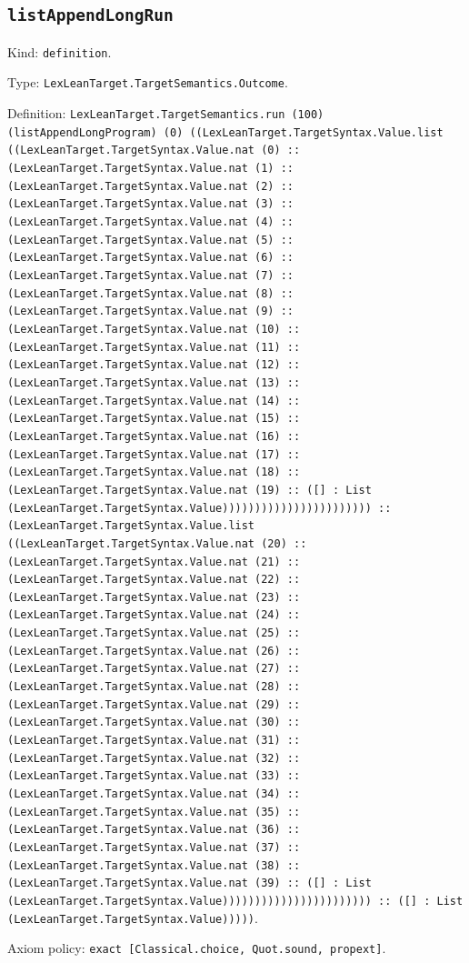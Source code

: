 \documentclass[11pt]{article}
\begin{document}
\subsection*{\texttt{listAppendLongRun}}
\noindent Kind: \texttt{definition}.\par
\noindent Type: \texttt{LexLeanTarget.TargetSemantics.Outcome}.\par
\noindent Definition: \texttt{LexLeanTarget.TargetSemantics.run (100) (listAppendLongProgram) (0) ((LexLeanTarget.TargetSyntax.Value.list ((LexLeanTarget.TargetSyntax.Value.nat (0) :: (LexLeanTarget.TargetSyntax.Value.nat (1) :: (LexLeanTarget.TargetSyntax.Value.nat (2) :: (LexLeanTarget.TargetSyntax.Value.nat (3) :: (LexLeanTarget.TargetSyntax.Value.nat (4) :: (LexLeanTarget.TargetSyntax.Value.nat (5) :: (LexLeanTarget.TargetSyntax.Value.nat (6) :: (LexLeanTarget.TargetSyntax.Value.nat (7) :: (LexLeanTarget.TargetSyntax.Value.nat (8) :: (LexLeanTarget.TargetSyntax.Value.nat (9) :: (LexLeanTarget.TargetSyntax.Value.nat (10) :: (LexLeanTarget.TargetSyntax.Value.nat (11) :: (LexLeanTarget.TargetSyntax.Value.nat (12) :: (LexLeanTarget.TargetSyntax.Value.nat (13) :: (LexLeanTarget.TargetSyntax.Value.nat (14) :: (LexLeanTarget.TargetSyntax.Value.nat (15) :: (LexLeanTarget.TargetSyntax.Value.nat (16) :: (LexLeanTarget.TargetSyntax.Value.nat (17) :: (LexLeanTarget.TargetSyntax.Value.nat (18) :: (LexLeanTarget.TargetSyntax.Value.nat (19) :: ([] : List (LexLeanTarget.TargetSyntax.Value))))))))))))))))))))))) :: (LexLeanTarget.TargetSyntax.Value.list ((LexLeanTarget.TargetSyntax.Value.nat (20) :: (LexLeanTarget.TargetSyntax.Value.nat (21) :: (LexLeanTarget.TargetSyntax.Value.nat (22) :: (LexLeanTarget.TargetSyntax.Value.nat (23) :: (LexLeanTarget.TargetSyntax.Value.nat (24) :: (LexLeanTarget.TargetSyntax.Value.nat (25) :: (LexLeanTarget.TargetSyntax.Value.nat (26) :: (LexLeanTarget.TargetSyntax.Value.nat (27) :: (LexLeanTarget.TargetSyntax.Value.nat (28) :: (LexLeanTarget.TargetSyntax.Value.nat (29) :: (LexLeanTarget.TargetSyntax.Value.nat (30) :: (LexLeanTarget.TargetSyntax.Value.nat (31) :: (LexLeanTarget.TargetSyntax.Value.nat (32) :: (LexLeanTarget.TargetSyntax.Value.nat (33) :: (LexLeanTarget.TargetSyntax.Value.nat (34) :: (LexLeanTarget.TargetSyntax.Value.nat (35) :: (LexLeanTarget.TargetSyntax.Value.nat (36) :: (LexLeanTarget.TargetSyntax.Value.nat (37) :: (LexLeanTarget.TargetSyntax.Value.nat (38) :: (LexLeanTarget.TargetSyntax.Value.nat (39) :: ([] : List (LexLeanTarget.TargetSyntax.Value))))))))))))))))))))))) :: ([] : List (LexLeanTarget.TargetSyntax.Value)))))}.\par
\noindent Axiom policy: \texttt{exact [Classical.choice, Quot.sound, propext]}.\par
\end{document}
